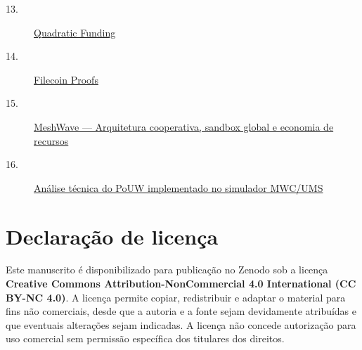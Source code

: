 \documentclass[12pt,a4paper]{article}
\begin{document}
\begin{description}
\item[13.] \href{https://gitcoin.co/mechanisms/quadratic-funding}{Quadratic Funding}

\item[14.] \href{https://docs.filecoin.io/core-concepts/filecoin-virtual-machine/proofs}{Filecoin Proofs}

\item[15.] \href{https://raw.githubusercontent.com/meshwave65/mwc-ums-sim/main/docs/02-arquitetura-cooperativa-sandbox-global-pouw.md}{MeshWave — Arquitetura cooperativa, sandbox global e economia de recursos}

\item[16.] \href{https://raw.githubusercontent.com/meshwave65/mwc-ums-sim/main/docs/ANALISE_TECNICA_POUW.md}{Análise técnica do PoUW implementado no simulador MWC/UMS}


\end{description}
\section{Declaração de licença}

Este manuscrito é disponibilizado para publicação no Zenodo sob a licença \textbf{Creative Commons Attribution-NonCommercial 4.0 International (CC BY-NC 4.0)}. A licença permite copiar, redistribuir e adaptar o material para fins não comerciais, desde que a autoria e a fonte sejam devidamente atribuídas e que eventuais alterações sejam indicadas. A licença não concede autorização para uso comercial sem permissão específica dos titulares dos direitos.\\
\end{document}

